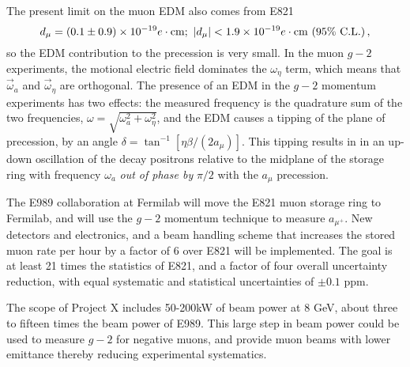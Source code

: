 The present limit on the muon EDM also comes from E821~\cite{Bennett08-edm}
\begin{equation}
d_\mu = (0.1 \pm 0.9) \times 10^{-19} e  \cdot {\rm cm}; \
 \vert d_\mu \vert < 1.9 \times 10^{-19}  e  \cdot {\rm cm}\ (95\%\ {\rm C.L.})\, ,
\label{muedm-result}
\end{equation}
so the EDM contribution to the precession is very small.  In the muon $g-2$
experiments, the motional electric field dominates the $\omega_\eta$ term,
which means that $\vec \omega_a$ and $\vec \omega_\eta$ are orthogonal.
The presence of an EDM in the  $g-2$ momentum experiments has two effects:
the measured frequency is the quadrature sum of the two frequencies,
 $\omega = \sqrt{\omega_a^2 + \omega_\eta^2}$, and the EDM causes a tipping of
 the plane of precession, by an angle
 $\delta = \tan ^{-1}[ \eta \beta/(2a_\mu)]$. This tipping results in
 in an up-down oscillation of the decay
 positrons relative to the midplane of the storage ring with frequency
$\omega_a$ {\it out of phase by} $\pi/2$ with the $a_\mu$ precession.

The E989 collaboration
at Fermilab will move the E821 muon storage ring to Fermilab, and
will use the  $g-2$ momentum technique to measure $a_{\mu^+}$.
 New detectors and electronics, and a
beam handling scheme that increases the stored muon rate per hour
 by a factor of 6
over E821 will be implemented.  The goal is at least 21 times the
statistics of E821, and a factor of four overall uncertainty reduction, with
equal systematic and statistical uncertainties of $\pm 0.1$ ppm.

The scope of Project X includes 50-200kW of beam power at 8 GeV,
about three to fifteen times the beam power of E989.  This large step in beam
power could be used to measure $g-2$ for negative muons,
and provide muon beams with lower emittance thereby reducing
experimental systematics. 

